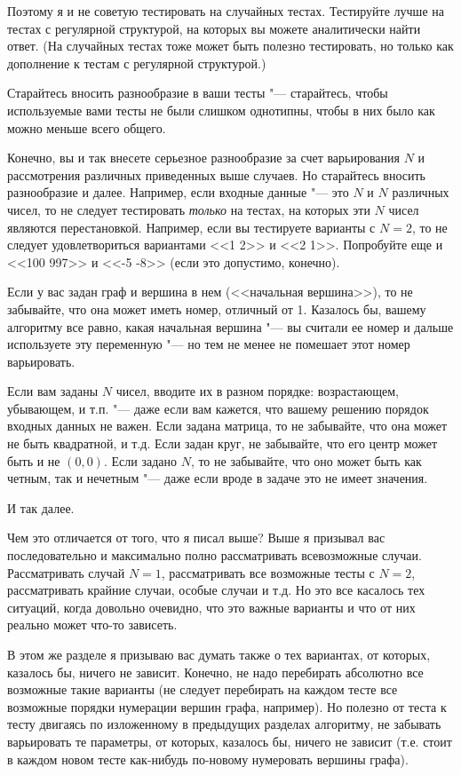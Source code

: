 \documentclass[a4paper,10pt]{problems}
\begin{document}
Поэтому я и не советую тестировать на случайных тестах. 
Тестируйте лучше на тестах с регулярной структурой, на которых вы можете аналитически найти ответ.
(На случайных тестах тоже может быть полезно тестировать, но только как дополнение к тестам с регулярной структурой.)

 Старайтесь вносить разнообразие в ваши тесты "--- старайтесь, чтобы используемые вами тесты не были слишком однотипны,
чтобы в них было как можно меньше всего общего.

Конечно, вы и так внесете серьезное разнообразие за счет варьирования $N$ и рассмотрения различных приведенных выше случаев. 
Но старайтесь вносить разнообразие и далее. 
Например, если входные данные "--- это $N$ и $N$ различных чисел, то не следует тестировать \textit{только} на тестах, на которых эти $N$ чисел являются
перестановкой. 
Например, если вы тестируете варианты с $N=2$, то не следует удовлетвориться вариантами <<1 2>> и <<2 1>>. 
Попробуйте еще и <<100 997>> и <<-5 -8>> (если это допустимо, конечно). 

Если у вас задан граф и вершина в нем (<<начальная вершина>>), то не забывайте, что она может иметь номер, отличный от 1. 
Казалось бы, вашему алгоритму все равно, какая начальная вершина "--- вы считали ее номер и дальше используете эту переменную "---
но тем не менее не помешает этот номер варьировать.

Если вам заданы $N$ чисел, вводите их в разном порядке: возрастающем, убывающем, и т.п. "--- даже если вам кажется, что вашему решению порядок входных данных не важен. 
Если задана матрица, то не забывайте, что она может не быть квадратной, и т.д. 
Если задан круг, не забывайте, что его центр может быть и не $(0,0)$.
Если задано $N$, то не забывайте, что оно может быть как четным, так и нечетным "--- даже если вроде в задаче это не имеет значения.

И так далее.

Чем это отличается от того, что я писал выше? Выше я призывал вас последовательно и максимально полно рассматривать всевозможные случаи. 
Рассматривать случай $N=1$, рассматривать все возможные тесты с $N=2$, рассматривать крайние случаи, особые случаи и т.д. 
Но это все касалось тех ситуаций, когда довольно очевидно, что это важные варианты и что от них реально может что-то зависеть.

В этом же разделе я призываю вас думать также о тех вариантах, от которых, казалось бы, ничего не зависит. 
Конечно, не надо перебирать абсолютно все возможные такие варианты (не следует перебирать на каждом тесте все возможные порядки нумерации вершин графа, например). 
Но полезно от теста к тесту двигаясь по изложенному в предыдущих разделах алгоритму, не забывать варьировать те параметры, от которых, казалось бы,
ничего не зависит (т.е. стоит в каждом новом тесте как-нибудь по-новому нумеровать вершины графа).
\end{document}
